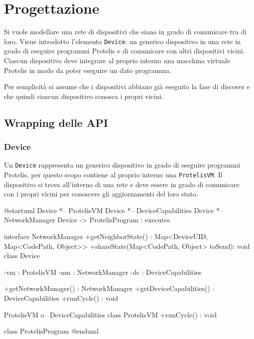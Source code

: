 \section{Progettazione}
Si vuole modellare una rete di dispositivi che siano in grado di comunicare tra
di loro. Viene introdotto l'elemento \texttt{Device}: un generico dispositivo in una rete
in grado di eseguire programmi Protelis e di comunicare con altri dispositivi
vicini. Ciascun dispositivo deve integrare al proprio interno una macchina
virtuale Protelis in modo da poter eseguire un dato programma.

Per semplicità si assume che i dispositivi abbiano già eseguito la fase di
discover e che quindi ciascun dispositivo conosca i propri vicini.

\subsection{Wrapping delle API}
\subsubsection{Device}
Un \texttt{Device} rappresenta un generico dispositivo in grado di eseguire programmi
Protelis, per questo scopo contiene al proprio interno una \texttt{ProtelisVM}. Il dispositivo si trova all'interno di una rete e deve essere in grado
di comunicare con i propri vicini per conoscere gli aggiornamenti del loro
stato.

\begin{center}
  \begin{plantuml}
    @startuml
    Device *-- ProtelisVM
    Device *-- DeviceCapabilities
    Device *-- NetworkManager
    Device -> ProtelisProgram : executes

    interface NetworkManager {
      +getNeighborState() : Map<DeviceUID, Map<CodePath, Object>>
      +shareState(Map<CodePath, Object> toSend): void
    }
    class Device {
      -vm : ProtelisVM
      -nm : NetworkManager
      -dc : DeviceCapabilities

      +getNetworkManager() : NetworkManager
      +getDeviceCapabilities() : DeviceCapabilities
      +runCycle() : void
    }

    ProtelisVM o-- DeviceCapabilities
    class ProtelisVM {
      +runCycle() : void
    }

    class ProtelisProgram { }
    @enduml
  \end{plantuml}
\end{center}


